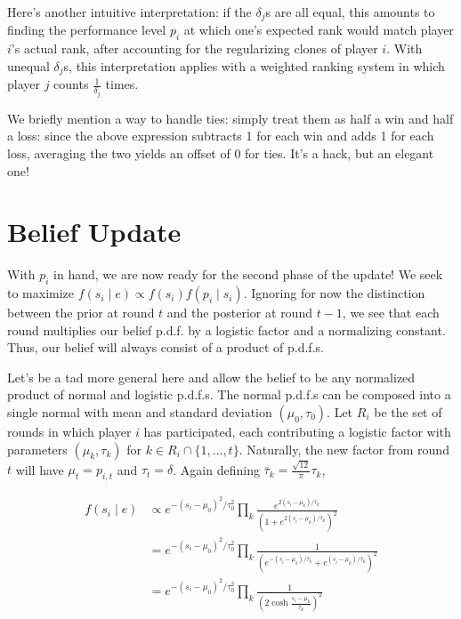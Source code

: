 \documentclass{article}
\begin{document}
Here's another intuitive interpretation: if the $\delta_j$s are all equal, this amounts to finding the performance level $p_i$ at which one's expected rank would match player $i$'s actual rank, after accounting for the regularizing clones of player $i$. With unequal $\delta_j$s, this interpretation applies with a weighted ranking system in which player $j$ counts $\frac{1}{\delta_j}$ times.

We briefly mention a way to handle ties: simply treat them as half a win and half a loss: since the above expression subtracts 1 for each win and adds 1 for each loss, averaging the two yields an offset of 0 for ties. It's a hack, but an elegant one!

\section{Belief Update}

With $p_i$ in hand, we are now ready for the second phase of the update! We seek to maximize $f(s_i\mid e) \propto f(s_i)f(p_i\mid s_i)$. Ignoring for now the distinction between the prior at round $t$ and the posterior at round $t-1$, we see that each round multiplies our belief p.d.f. by a logistic factor and a normalizing constant. Thus, our belief will always consist of a product of p.d.f.s.

Let's be a tad more general here and allow the belief to be any normalized product of normal and logistic p.d.f.s. The normal p.d.f.s can be composed into a single normal with mean and standard deviation $(\mu_0, \tau_0)$. Let $R_i$ be the set of rounds in which player $i$ has participated, each contributing a logistic factor with parameters $(\mu_k, \tau_k)$ for $k\in R_i\cap \{1,\ldots,t\}$. Naturally, the new factor from round $t$ will have $\mu_t = p_{i,t}$ and $\tau_t = \delta$. Again defining $\bar\tau_k = \frac{\sqrt{12}}{\pi} \tau_k$,

\begin{align*}
f(s_i\mid e)
&\propto e^{-(s_i-\mu_0)^2/\tau_0^2} \prod_k \frac { e^{2(s_i-\mu_k)/\bar\tau_k} } { \left(1 + e^{2(s_i-\mu_k)/\bar\tau_k} \right)^2 }
\\&= e^{-(s_i-\mu_0)^2/\tau_0^2} \prod_k \frac { 1 } { \left( e^{-(s_i-\mu_k)/\bar\tau_k} + e^{(s_i-\mu_k)/\bar\tau_k} \right)^2 }
\\&= e^{-(s_i-\mu_0)^2/\tau_0^2} \prod_k \frac { 1 } { \left( 2\cosh\frac{s_i-\mu_k} {\bar\tau_k} \right)^2 }
\end{align*}
\end{document}

